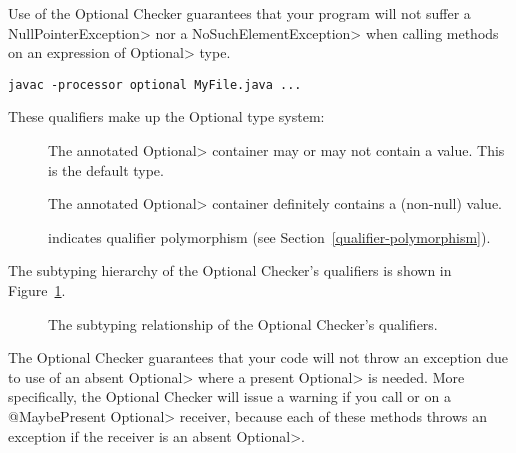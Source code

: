 Use of the Optional Checker guarantees that your program will not suffer a
\<NullPointerException> nor a \<NoSuchElementException> when calling
methods on an expression of \<Optional> type.



\begin{Verbatim}
javac -processor optional MyFile.java ...
\end{Verbatim}



These qualifiers make up the Optional type system:

\begin{description}

\item[]
  The annotated \<Optional> container may or may not contain a value.
  This is the default type.

\item[]
  The annotated \<Optional> container definitely contains a (non-null) value.

\item[]
  indicates qualifier polymorphism (see Section~\ref{qualifier-polymorphism}).

\end{description}

The subtyping hierarchy of the Optional Checker's qualifiers is shown in
Figure~\ref{fig-optional-hierarchy}.

\begin{figure}
\caption{The subtyping relationship of the Optional Checker's qualifiers.}
\label{fig-optional-hierarchy}
\end{figure}



The Optional Checker guarantees that your code will not throw an exception
due to use of an absent \<Optional> where a present \<Optional> is needed.
More specifically, the Optional Checker will issue a warning if you call
or
on a \<@MaybePresent Optional> receiver, because each of these methods
throws an exception if the receiver is an absent
\<Optional>.

